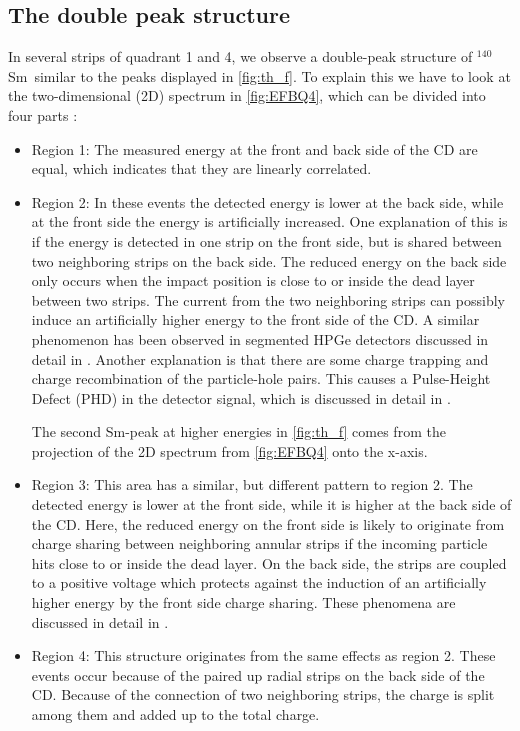 \documentclass[twoside,english]{uiofysmaster/uiofysmaster}
\newcommand{\Sm}{$^{140}$Sm} %
\let\orgautoref\autoref
\renewcommand{\autoref}
        {%
		 \def\sectionautorefname{Section}%
		 \def\subsectionautorefname{Section}%
		 \def\subsubsectionautorefname{Section}%
		 \def\chapterautorefname{Chapter}%
          \orgautoref}
\begin{document}
\newpage

\subsection{The double peak structure}\label{ssec:DPS}
In several strips of quadrant 1 and 4, we observe a double-peak structure of \Sm\ similar to the peaks displayed in \autoref{fig:th_f}. 
To explain this we have to look at the two-dimensional (2D) spectrum in \autoref{fig:EFBQ4}, which can be divided into four parts \cite{Rosiak}:
\begin{itemize}
	\item Region 1: The measured energy at the front and back side of the CD are equal, which indicates that they are linearly correlated.
	\item Region 2: In these events the detected energy is lower at the back side, while at the front side the energy is artificially increased. 
	One explanation of this is if the energy is detected in one strip on the front side, but is shared between two neighboring strips on the back side.
	The reduced energy on the back side only occurs when the impact position is close to or inside the dead layer between two strips. 
	The current from the two neighboring strips can possibly induce an artificially higher energy to the front side of the CD. 
	A similar phenomenon has been observed in segmented HPGe detectors discussed in detail in \cite{Bruyneel2006a, Bruyneel2006b, Bruyneel, Descovich2005, Abt2017}.	
	Another explanation is that there are some charge trapping and charge recombination of the particle-hole pairs. 
	This causes a Pulse-Height Defect (PHD) in the detector signal, which is discussed in detail in \cite{Miller1962, Wilkins1971}.
	
	The second Sm-peak at higher energies in \autoref{fig:th_f} comes from the projection of the 2D spectrum from \autoref{fig:EFBQ4} onto the x-axis.
	\item Region 3: This area has a similar, but different pattern to region 2. 
	The detected energy is lower at the front side, while it is higher at the back side of the CD. 
	Here, the reduced energy on the front side is likely to originate from charge sharing between neighboring annular strips if the incoming particle hits close to or inside the dead layer. 
	 On the back side, the strips are coupled to a positive voltage which protects against the induction of an artificially higher energy by the front side charge sharing. 
	These phenomena are discussed in detail in \cite{Grassi2014, Kramberger2002}.
	\item Region 4: This structure originates from the same effects as region 2.
	These events occur because of the paired up radial strips on the back side of the CD.  
	Because of the connection of two neighboring strips, the charge is split among them and added up to the total charge.
\end{itemize}
\end{document}
